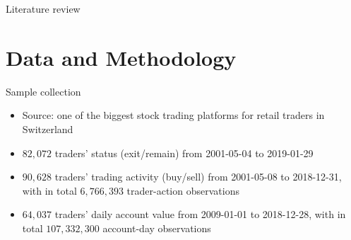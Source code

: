 \documentclass{beamer}
\begin{document}
\begin{frame}{Literature review}
\begin{itemize}
	\end{itemize}

\end{frame}


\section{Data and Methodology}

\begin{frame}{Sample collection}

\begin{itemize}
	\item Source: one of the biggest stock trading platforms for retail traders in Switzerland
	\item $82,072$ traders' status (exit/remain) from 2001-05-04 to 2019-01-29
	\item $90,628$ traders' trading activity (buy/sell) from 2001-05-08 to 2018-12-31,
	with in total $6,766,393$ trader-action observations
	\item $64,037$ traders' daily account value from 2009-01-01 to 2018-12-28,
	with in total $107,332,300$ account-day observations
\end{itemize}

\end{frame}
\end{document}
